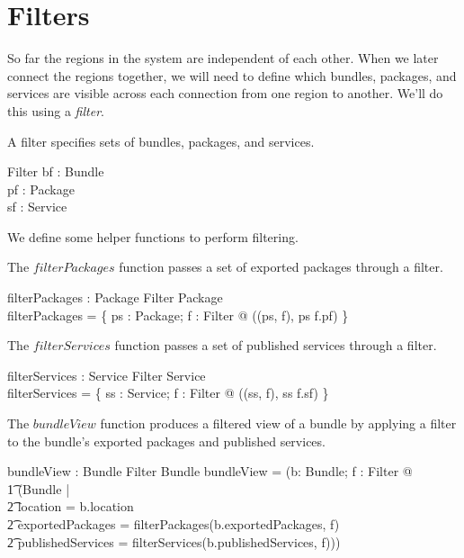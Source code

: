 \documentclass[a4paper,9pt,twoside]{article}
\begin{document}
\clearpage
\section{Filters}
\label{cha:filters}

So far the regions in the system are independent of each other.
When we later connect the regions together, we will need to define which bundles,
packages, and services are visible across each connection from one region to another.
We'll do this using a \textit{filter}.

A filter specifies sets of bundles, packages, and services.
\begin{schema}{Filter}
  bf : \power Bundle \\
  pf : \power Package \\
  sf : \power Service \\
\end{schema}

We define some helper functions to perform filtering.

The $filterPackages$ function passes a set of exported packages through a filter.
\begin{axdef}
  filterPackages : \power Package \cross Filter \fun \power Package \\
\where
  filterPackages = \{ ps : \power Package; f : Filter @ ((ps, f), ps \cap f.pf) \}
\end{axdef}

The $filterServices$ function passes a set of published services through a filter.
\begin{axdef}
  filterServices : \power Service \cross Filter \fun \power Service \\
\where
  filterServices = \{ ss : \power Service; f : Filter @ ((ss, f), ss \cap f.sf) \}
\end{axdef}

The $bundleView$ function produces a filtered view of a bundle by applying a filter to the bundle's exported packages and published services.
\begin{axdef}
  bundleView : Bundle \cross Filter \fun Bundle
\where
  bundleView = (\lambda b: Bundle; f : Filter @ \\
\t1  (\mu Bundle | \\
\t2 location = b.location \land \\
\t2 exportedPackages = filterPackages(b.exportedPackages, f) \land \\
\t2 publishedServices = filterServices(b.publishedServices, f)))
\end{axdef}
\end{document}

